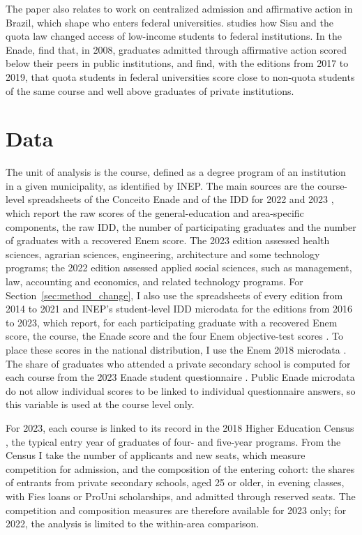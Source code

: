 \documentclass[12pt,letterpaper]{article}
\begin{document}
The paper also relates to work on centralized admission and affirmative action in Brazil, which shape who enters federal universities. \citet{mello2022} studies how Sisu and the quota law changed access of low-income students to federal institutions. In the Enade, \citet{waltenberg2013} find that, in 2008, graduates admitted through affirmative action scored below their peers in public institutions, and \citet{bielschowsky2023} find, with the editions from 2017 to 2019, that quota students in federal universities score close to non-quota students of the same course and well above graduates of private institutions.

\section{Data}\label{sec:data}

The unit of analysis is the course, defined as a degree program of an institution in a given municipality, as identified by INEP. The main sources are the course-level spreadsheets of the Conceito Enade and of the IDD for 2022 and 2023 \citep{inepidd2022,inepidd2023}, which report the raw scores of the general-education and area-specific components, the raw IDD, the number of participating graduates and the number of graduates with a recovered Enem score. The 2023 edition assessed health sciences, agrarian sciences, engineering, architecture and some technology programs; the 2022 edition assessed applied social sciences, such as management, law, accounting and economics, and related technology programs. For Section~\ref{sec:method_change}, I also use the spreadsheets of every edition from 2014 to 2021 \citep{inepidd2019,inepindicadores} and INEP's student-level IDD microdata for the editions from 2016 to 2023, which report, for each participating graduate with a recovered Enem score, the course, the Enade score and the four Enem objective-test scores \citep{inepiddmicro}. To place these scores in the national distribution, I use the Enem 2018 microdata \citep{inepenem2018}. The share of graduates who attended a private secondary school is computed for each course from the 2023 Enade student questionnaire \citep{inepenade}. Public Enade microdata do not allow individual scores to be linked to individual questionnaire answers, so this variable is used at the course level only.

For 2023, each course is linked to its record in the 2018 Higher Education Census \citep{inepcenso}, the typical entry year of graduates of four- and five-year programs. From the Census I take the number of applicants and new seats, which measure competition for admission, and the composition of the entering cohort: the shares of entrants from private secondary schools, aged 25 or older, in evening classes, with Fies loans or ProUni scholarships, and admitted through reserved seats. The competition and composition measures are therefore available for 2023 only; for 2022, the analysis is limited to the within-area comparison.
\end{document}
